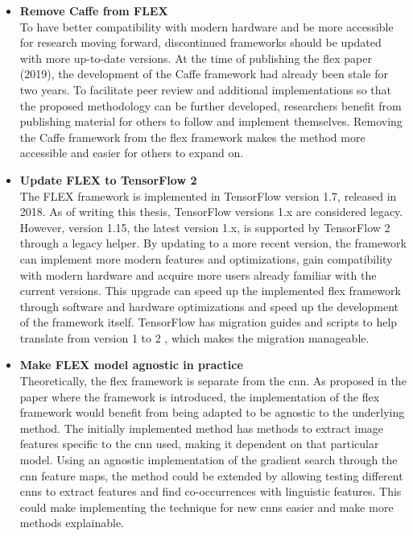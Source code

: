             \begin{itemize}
                \item \textbf{Remove Caffe from FLEX\\} 
                To have better compatibility with modern hardware and be more accessible for research moving forward, discontinued frameworks should be updated with more up-to-date versions. At the time of publishing the \gls{flex} paper (2019), the development of the Caffe framework had already been stale for two years. To facilitate peer review and additional implementations so that the proposed methodology can be further developed, researchers benefit from publishing material for others to follow and implement themselves. 
                Removing the Caffe framework from the \gls{flex} framework makes the method more accessible and easier for others to expand on.

                \item \textbf{Update FLEX to TensorFlow 2\\}
                The FLEX framework is implemented in TensorFlow version 1.7, released in 2018. As of writing this thesis, TensorFlow versions 1.x are considered legacy. However, version 1.15, the latest version 1.x, is supported by TensorFlow 2 through a legacy helper. By updating to a more recent version, the framework can implement more modern features and optimizations, gain compatibility with modern hardware and acquire more users already familiar with the current versions. This upgrade can speed up the implemented \gls{flex} framework through software and hardware optimizations and speed up the development of the framework itself. 
                TensorFlow has migration guides and scripts to help translate from version 1 to 2 \cite{MigrateTensorFlowTensorFlow}, which makes the migration manageable. 
    

                \item \textbf{Make FLEX model agnostic in practice\\}
                Theoretically, the \gls{flex} framework is separate from the \gls{cnn}. As proposed in the paper where the framework is introduced, the implementation of the \gls{flex} framework would benefit from being adapted to be agnostic to the underlying method. The initially implemented method has methods to extract image features specific to the \gls{cnn} used, making it dependent on that particular model. Using an agnostic implementation of the gradient search through the \gls{cnn} feature maps, the method could be extended by allowing testing different \glspl{cnn} to extract features and find co-occurrences with linguistic features. This could make implementing the technique for new \glspl{cnn} easier and make more methods explainable. 

            \end{itemize}

